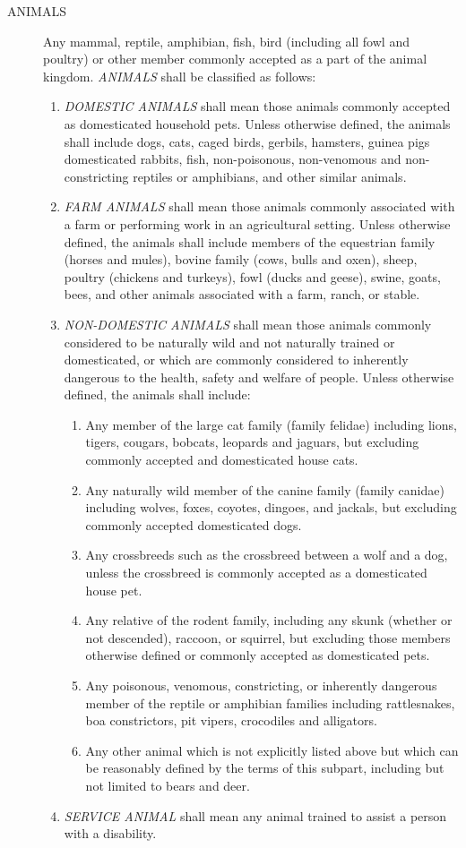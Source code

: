 \begin{description}
    \item[ANIMALS] Any mammal, reptile, amphibian, fish, bird (including all fowl and poultry) or other member commonly accepted as a part of the animal kingdom.  \emph{ANIMALS} shall be classified as follows:
    \begin{enumerate}[{\indent}1)]
        \item \emph{DOMESTIC ANIMALS} shall mean those animals commonly accepted as domesticated household pets.  Unless otherwise defined, the animals shall include dogs, cats, caged birds, gerbils, hamsters, guinea pigs domesticated rabbits, fish, non-poisonous, non-venomous and non-constricting reptiles or amphibians, and other similar animals.
        \item \emph{FARM ANIMALS} shall mean those animals commonly associated with a farm or performing work in an agricultural setting.  Unless otherwise defined, the animals shall include members of the equestrian family (horses and mules), bovine family (cows, bulls and oxen), sheep, poultry (chickens and turkeys), fowl (ducks and geese), swine, goats, bees, and other animals associated with a farm, ranch, or stable.
        \item \emph{NON-DOMESTIC ANIMALS} shall mean those animals commonly considered to be naturally wild and not naturally trained or domesticated, or which are commonly considered to inherently dangerous to the health, safety and welfare of people.  Unless otherwise defined, the animals shall include:
        \begin{enumerate}
            \item Any member of the large cat family (family felidae) including lions, tigers, cougars, bobcats, leopards and jaguars, but excluding commonly accepted and domesticated house cats.
            \item Any naturally wild member of the canine family (family canidae) including wolves, foxes, coyotes, dingoes, and jackals, but excluding commonly accepted domesticated dogs.
            \item Any crossbreeds such as the crossbreed between a wolf and a dog, unless the crossbreed is commonly accepted as a domesticated house pet.
            \item Any relative of the rodent family, including any skunk (whether or not descended), raccoon, or squirrel, but excluding those members otherwise defined or commonly accepted as domesticated pets.
            \item Any poisonous, venomous, constricting, or inherently dangerous member of the reptile or amphibian families including rattlesnakes, boa constrictors, pit vipers, crocodiles and alligators.
            \item Any other animal which is not explicitly listed above but which can be reasonably defined by the terms of this subpart, including but not limited to bears and deer.
        \end{enumerate}
        \item \emph{SERVICE ANIMAL} shall mean any animal trained to assist a person with a disability.
    \end{enumerate}
\end{description}
